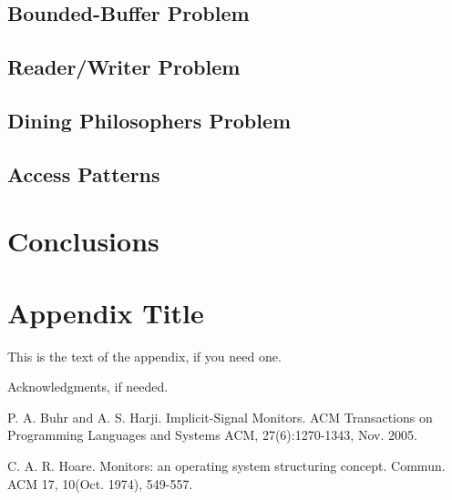 \documentclass[preprint]{sigplanconf}
\begin{document}
\subsection{Bounded-Buffer Problem}
\subsection{Reader/Writer Problem}
\subsection{Dining Philosophers  Problem}
\subsection{Access Patterns}



\section{Conclusions} \label{sec:conclu}

\appendix
\section{Appendix Title}

This is the text of the appendix, if you need one.

\acks

Acknowledgments, if needed.





\begin{thebibliography}{}
    \softraggedright

    P. A. Buhr and A. S. Harji. Implicit-Signal Monitors. ACM Transactions on 
    Programming Languages and Systems ACM, 27(6):1270-1343, Nov. 2005.

     C. A. R. Hoare. Monitors: an operating system structuring concept. Commun. 
     ACM 17, 10(Oct. 1974), 549-557.

\end{thebibliography}
\end{document}
